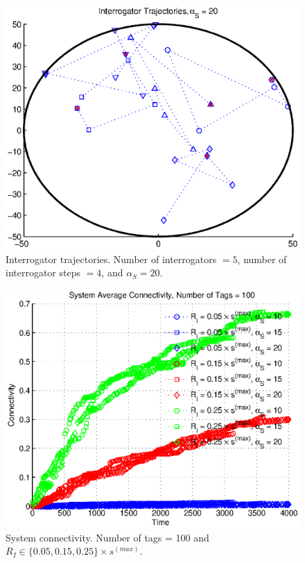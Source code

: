 \begin{figure}
\centering
\includegraphics[width=5in]{Chapter_4_Figures/interrogator_traj_alpha_S_20.eps}
\caption{Interrogator trajectories. Number of interrogators $=5$, number of interrogator steps $=4$, and $\alpha_S = 20$.}
\label{Figure: interrogator_traj_alpha_S_20.eps}
\end{figure}
\begin{figure}
\centering
\includegraphics[width=5in]{Chapter_4_Figures/sys_connect_100tags_all.eps}
\caption{System connectivity. Number of tags = 100 and $R_I \in \{0.05, 0.15, 0.25\} \times s^{(max)}$.}
\label{Figure: sys_connect_100tags_all.eps}
\end{figure}
\clearpage

